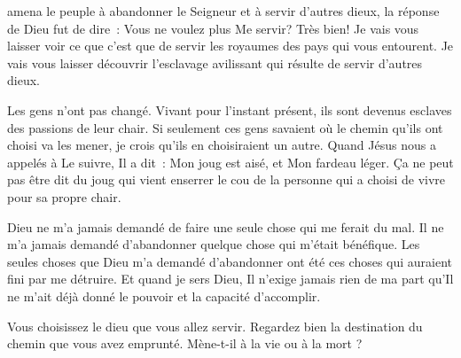 \dvrule







 amena le peuple à abandonner le Seigneur
 et à servir d'autres dieux, la réponse de Dieu fut de dire~:
 \og Vous ne voulez plus Me servir? Très bien!
 Je vais vous laisser voir ce que c'est que de servir les royaumes
 des pays qui vous entourent. Je vais vous laisser découvrir l'esclavage
 avilissant qui résulte de servir d'autres dieux. \fg{}


Les gens n'ont pas changé. Vivant pour l'instant présent, ils sont devenus
 esclaves des passions de leur chair. Si seulement ces gens savaient
 où le chemin qu'ils ont choisi va les mener, je crois qu'ils en choisiraient
 un autre. Quand Jésus nous a appelés à Le suivre, Il a dit~:
 \og Mon joug est aisé, et Mon fardeau léger. \fg{}
 Ça ne peut pas être dit du joug qui vient enserrer le cou de la personne
 qui a choisi de vivre pour sa propre chair. 

Dieu ne m'a jamais demandé de faire une seule chose qui me ferait du mal.
 Il ne m'a jamais demandé d'abandonner quelque chose qui m'était bénéfique.
 Les seules choses que Dieu m'a demandé d'abandonner ont été ces choses
 qui auraient fini par me détruire. Et quand je sers Dieu,
 Il n'exige jamais rien de ma part qu'Il ne m'ait déjà donné le pouvoir
 et la capacité d'accomplir. 

Vous choisissez le dieu que vous allez servir. Regardez bien la destination
 du chemin que vous avez emprunté. Mène-t-il à la vie ou à la mort ? 

\dvrule




